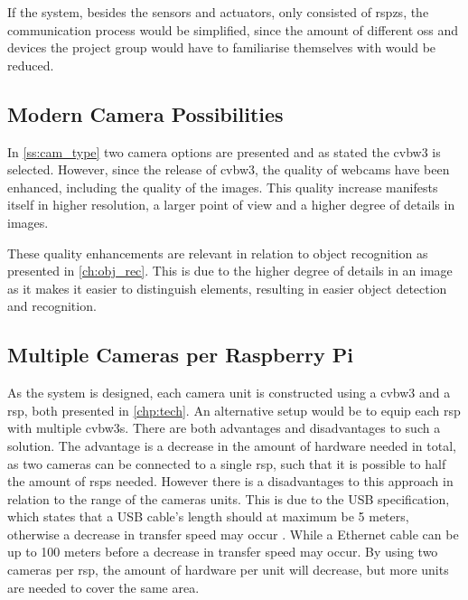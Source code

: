 If the system, besides the sensors and actuators, only consisted of \glspl{rspz}, the communication process would be simplified, since the amount of different \glspl{os} and devices the project group would have to familiarise themselves with would be reduced.

\subsection{Modern Camera Possibilities}\label{subsec:disc_modern_cam}
In \cref{ss:cam_type} two camera options are presented and as stated the \acrfull{cvbw3} is selected. However, since the release of \gls{cvbw3}, the quality of webcams have been enhanced, including the quality of the images. This quality increase manifests itself in higher resolution, a larger point of view and a higher degree of details in images.

These quality enhancements are relevant in relation to object recognition as presented in \cref{ch:obj_rec}. This is due to the higher degree of details in an image as it makes it easier to distinguish elements, resulting in easier object detection and recognition.

\subsection{Multiple Cameras per Raspberry Pi}\label{subsec:disc_mult_pi}
As the system is designed, each camera unit is constructed using a \gls{cvbw3} and a \gls{rsp}, both presented in \cref{chp:tech}. An alternative setup would be to equip each \gls{rsp} with multiple \glspl{cvbw3}. There are both advantages and disadvantages to such a solution. The advantage is a decrease in the amount of hardware needed in total, as two cameras can be connected to a single \gls{rsp}, such that it is possible to half the amount of \glspl{rsp} needed. However there is a disadvantages to this approach in relation to the range of the cameras units. This is due to the USB specification, which states that a USB cable's length should at maximum be 5 meters, otherwise a decrease in transfer speed may occur \cite{usb_spec}. While a Ethernet cable can be up to 100 meters before a decrease in transfer speed may occur. By using two cameras per \gls{rsp}, the amount of hardware per unit will decrease, but more units are needed to cover the same area.

